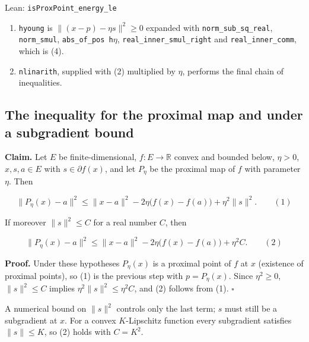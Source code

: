 \documentclass[11pt,a4paper]{report}
\begin{document}
\begin{leanbox}{Lean: \texttt{isProxPoint\_\allowbreak{}energy\_\allowbreak{}le}}
\begin{enumerate}
\item \texttt{hyoung} is \(\|(x-p)-\eta s\|^2\ge0\) expanded with \texttt{norm\_\allowbreak{}sub\_\allowbreak{}sq\_\allowbreak{}real}, \texttt{norm\_\allowbreak{}smul}, \texttt{abs\_\allowbreak{}of\_\allowbreak{}pos h\ensuremath{\eta}}, \texttt{real\_\allowbreak{}inner\_\allowbreak{}smul\_\allowbreak{}right} and \texttt{real\_\allowbreak{}inner\_\allowbreak{}comm}, which is (4).

\item \texttt{nlinarith}, supplied with (2) multiplied by \(\eta\), performs the final chain of inequalities.

\end{enumerate}
\end{leanbox}
\subsection{\texorpdfstring{The inequality for the proximal map and under a subgradient bound}{The inequality for the proximal map and under a subgradient bound}}
\label{report-step-ProximalLangevin-ProximalEnergy-lean-2}


\textbf{Claim.} Let \(E\) be finite-dimensional, \(f:E\to\mathbb R\) convex and bounded below, \(\eta>0\), \(x,s,a\in E\) with \(s\in\partial f(x)\), and let \(P_\eta\) be the proximal map of \(f\) with parameter \(\eta\). Then


\[\|P_\eta(x)-a\|^2\le\|x-a\|^2-2\eta\bigl(f(x)-f(a)\bigr)+\eta^2\|s\|^2.\qquad(1)\]


If moreover \(\|s\|^2\le C\) for a real number \(C\), then


\[\|P_\eta(x)-a\|^2\le\|x-a\|^2-2\eta\bigl(f(x)-f(a)\bigr)+\eta^2C.\qquad(2)\]


\textbf{Proof.} Under these hypotheses \(P_\eta(x)\) is a proximal point of \(f\) at \(x\) (existence of proximal points), so (1) is the previous step with \(p=P_\eta(x)\). Since \(\eta^2\ge0\), \(\|s\|^2\le C\) implies \(\eta^2\|s\|^2\le\eta^2C\), and (2) follows from (1). \(\square\)




A numerical bound on \(\|s\|^2\) controls only the last term; \(s\) must still be a subgradient at \(x\). For a convex \(K\)-Lipschitz function every subgradient satisfies \(\|s\|\le K\), so (2) holds with \(C=K^2\).
\end{document}
